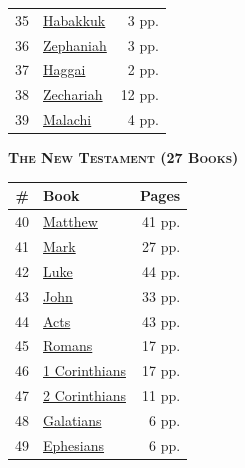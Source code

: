\documentclass[10pt,letterpaper]{article}
\begin{document}
\begin{minipage}[t]{0.485\textwidth}
\begin{tabularx}{\linewidth}{r X r}
35 & \href{https://cdn.jsdelivr.net/gh/vtrandal/WordofGod@main/books/35_Habakkuk.pdf}{Habakkuk} & 3 pp. \\
36 & \href{https://cdn.jsdelivr.net/gh/vtrandal/WordofGod@main/books/36_Zephaniah.pdf}{Zephaniah} & 3 pp. \\
37 & \href{https://cdn.jsdelivr.net/gh/vtrandal/WordofGod@main/books/37_Haggai.pdf}{Haggai} & 2 pp. \\
38 & \href{https://cdn.jsdelivr.net/gh/vtrandal/WordofGod@main/books/38_Zechariah.pdf}{Zechariah} & 12 pp. \\
39 & \href{https://cdn.jsdelivr.net/gh/vtrandal/WordofGod@main/books/39_Malachi.pdf}{Malachi} & 4 pp. \\
\bottomrule
\end{tabularx}
\end{minipage}\hfill
\begin{minipage}[t]{0.485\textwidth}
\centering
{\bfseries\scshape The New Testament \footnotesize(27 Books)}\\[0.4em]
\begin{tabularx}{\linewidth}{r X r}
\toprule
\textbf{\#} & \textbf{Book} & \textbf{Pages} \\
\midrule
40 & \href{https://cdn.jsdelivr.net/gh/vtrandal/WordofGod@main/books/40_Matthew.pdf}{Matthew} & 41 pp. \\
41 & \href{https://cdn.jsdelivr.net/gh/vtrandal/WordofGod@main/books/41_Mark.pdf}{Mark} & 27 pp. \\
42 & \href{https://cdn.jsdelivr.net/gh/vtrandal/WordofGod@main/books/42_Luke.pdf}{Luke} & 44 pp. \\
43 & \href{https://cdn.jsdelivr.net/gh/vtrandal/WordofGod@main/books/43_John.pdf}{John} & 33 pp. \\
44 & \href{https://cdn.jsdelivr.net/gh/vtrandal/WordofGod@main/books/44_Acts.pdf}{Acts} & 43 pp. \\
45 & \href{https://cdn.jsdelivr.net/gh/vtrandal/WordofGod@main/books/45_Romans.pdf}{Romans} & 17 pp. \\
46 & \href{https://cdn.jsdelivr.net/gh/vtrandal/WordofGod@main/books/46_1_Corinthians.pdf}{1 Corinthians} & 17 pp. \\
47 & \href{https://cdn.jsdelivr.net/gh/vtrandal/WordofGod@main/books/47_2_Corinthians.pdf}{2 Corinthians} & 11 pp. \\
48 & \href{https://cdn.jsdelivr.net/gh/vtrandal/WordofGod@main/books/48_Galatians.pdf}{Galatians} & 6 pp. \\
49 & \href{https://cdn.jsdelivr.net/gh/vtrandal/WordofGod@main/books/49_Ephesians.pdf}{Ephesians} & 6 pp. \\

\end{tabularx}
\end{minipage}
\end{document}
